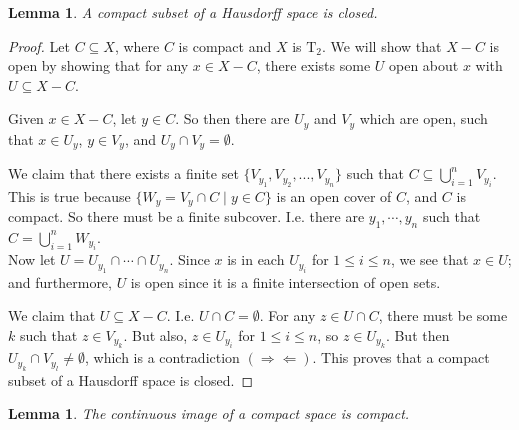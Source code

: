 \documentclass[12pt]{report}
\newcommand{\contra}{$(\Rightarrow\Leftarrow)$}
\newcommand{\T}[1]{$\textrm{T}_#1$}
\newtheorem{lemma}[theorem]{Lemma}
\begin{document}
\begin{lemma} 
\label{compacthausdorfflemma}
A compact subset of a Hausdorff space is closed.
\end{lemma}

\begin{proof}
Let $C \subseteq X$, where $C$ is compact and $X$ is \T{2}. We will show that
$X - C$ is open by showing that for any $x \in X - C$, there exists some $U$
open about $x$ with $U \subseteq X - C$.

Given $x \in X - C$, let $y \in C$. So then there are $U_y$ and $V_y$ which
are open, such that $x \in U_y$, $y \in V_y$, and $U_y \cap V_y = \emptyset$.

We claim that there exists a finite set $\{V_{y_1}, V_{y_2}, ..., V_{y_n}\}$
such that $C \subseteq  \bigcup_{i = 1}^{n}V_{y_i}$. This is true because
$\{W_y = V_y \cap C \mid y \in C\}$ is an open cover of $C$, and $C$ is compact.
So there must be a finite subcover. I.e. there are $y_1, \cdots, y_n$ such
that $C = \bigcup_{i = 1}^{n}W_{y_i}$. \\

Now let $U = U_{y_1} \cap \cdots \cap U_{y_n}$. Since $x$ is in each $U_{y_i}$
for $1 \leq i \leq n$, we see that $x \in U$; and furthermore, $U$ is open
since it is a finite intersection of open sets.

We claim that $U \subseteq X - C$. I.e. $U \cap C = \emptyset$. For any
$z \in U \cap C$, there must be some $k$ such that $z \in V_{y_k}$. But also, 
$z \in U_{y_i}$ for $1 \leq i \leq n$, so $z \in U_{y_k}$. But then 
$U_{y_k} \cap V_{y_l} \neq \emptyset$, which is a contradiction \contra.
This proves that a compact subset of a Hausdorff space is
closed.
\end{proof}

\begin{lemma} 
\label{continuouscompactlemma}
The continuous image of a compact space is compact.
\end{lemma}
\end{document}
